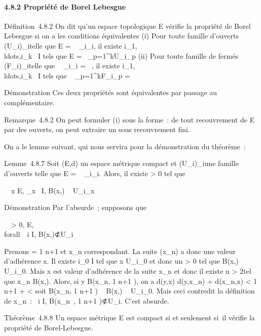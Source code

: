 \documentclass[]{article}
\begin{document}
\paragraph{4.8.2 Propriété de Borel Lebesgue}

Définition~4.8.2 On dit qu'un espace topologique E vérifie la propriété
de Borel Lebesgue si on a les conditions équivalentes (i) Pour toute
famille d'ouverts (U\_i)\_i\inI telle que E
= \⋃ ~
\_i\inIU\_i, il existe
i\_1,\\ldots,i\_k~
\in I tels que E =\ \⋃
 \_p=1^kU\_i\_p (ii) Pour toute famille
de fermés (F\_i)\_i\inI telle que
\⋂ ~
\_i\inIF\_i = \varnothing~, il existe
i\_1,\\ldots,i\_k~
\in I tels que \⋂ ~
\_p=1^kF\_i\_p = \varnothing~

Démonstration Ces deux propriétés sont équivalentes par passage au
complémentaire.

Remarque~4.8.2 On peut formuler (i) sous la forme~: de tout recouvrement
de E par des ouverts, on peut extraire un sous recouvrement fini.

On a le lemme suivant, qui nous servira pour la démonstration du
théorème~:

Lemme~4.8.7 Soit (E,d) un espace métrique compact et
(U\_i)\_i\inI une famille d'ouverts telle que E
= \⋃ ~
\_i\inIU\_i. Alors, il existe \epsilon \textgreater{} 0 tel que

\forall~~x \in E,
\existsi\_x~ \in I, B(x,\epsilon) \subset~
U\_i\_x

Démonstration Par l'absurde~; supposons que

\forall~~\epsilon \textgreater{} 0,
\existsx \in E, \\forall~~i \in I,
B(x,\epsilon)⊄U\_i

Prenons \epsilon = 1 \over n+1 et x\_n
correspondant. La suite (x\_n) a donc une valeur d'adhérence x.
Il existe i\_0 \in I tel que x \in U\_i\_0 et donc
un \eta \textgreater{} 0 tel que B(x,\eta) \subset~ U\_i\_0. Mais x
est valeur d'adhérence de la suite x\_n et donc il existe n
\textgreater{} 2\diagup\eta tel que x\_n \in B(x,\eta{}). Alors, si y \in
B(x\_n, 1 \over n+1 ), on a d(y,x) \leq
d(y,x\_n) + d(x\_n,x) \textless{} 1
\over n+1 + \eta {} \textless{} \eta
soit B(x\_n, 1 \over n+1 ) \subset~ B(x,\eta) \subset~
U\_i\_0. Mais ceci contredit la définition de
x\_n~: \forall~i \in I, B(x\_n~, 1
\over n+1 )⊄U\_i. C'est absurde.

Théorème~4.8.8 Un espace métrique E est compact si et seulement si~il
vérifie la propriété de Borel-Lebesgue.
\end{document}
